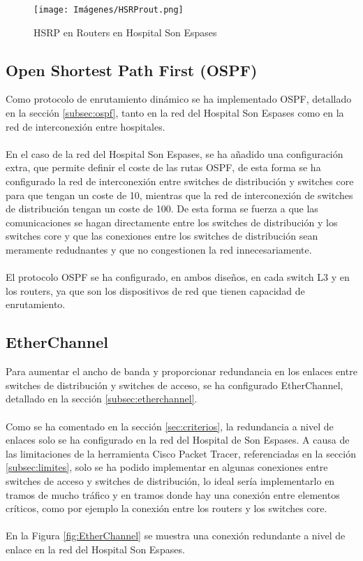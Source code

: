 \begin{figure}[H]
    \centering
    \texttt{[image: Imágenes/HSRProut.png]}
    \caption{HSRP en Routers en Hospital Son Espases}
    \label{fig:HSRPRou}
\end{figure}

\subsection{Open Shortest Path First (OSPF)}
Como protocolo de enrutamiento dinámico se ha implementado OSPF, detallado en la sección \ref{subsec:ospf}, 
tanto en la red del Hospital Son Espases como en la red de interconexión entre hospitales. 
\\ \\
En el caso de la red del Hospital Son Espases, se ha añadido una configuración extra, que permite definir el coste de las rutas OSPF, de esta forma se ha configurado la red de 
interconexión entre switches de distribución y switches core para que tengan un coste de 10, mientras que la red de interconexión de switches de distribución tengan un coste de 100. De
 esta forma se fuerza a que las comunicaciones se hagan directamente entre los switches de distribución y los switches core y que las conexiones entre los switches de distribución sean meramente redudnantes y que no 
congestionen la red innecesariamente.
\\ \\
El protocolo OSPF se ha configurado, en ambos diseños, en cada switch L3 y en los routers, ya que son los dispositivos de red que tienen capacidad de enrutamiento.

\subsection{EtherChannel}
Para aumentar el ancho de banda y proporcionar redundancia en los enlaces entre switches de distribución y switches de acceso, se ha configurado EtherChannel, detallado en la sección \ref{subsec:etherchannel}.
\\ \\
Como se ha comentado en la sección \ref{sec:criterios}, la redundancia a nivel de enlaces solo se ha configurado en la red del Hospital de Son Espases. A causa de las limitaciones de la herramienta Cisco Packet Tracer, referenciadas en la sección \ref{subsec:limites},
solo se ha podido implementar en algunas conexiones entre switches de acceso y switches de distribución, lo ideal sería implementarlo en tramos de mucho tráfico y en tramos donde hay una conexión entre elementos críticos, como por ejemplo la conexión entre los routers y los switches core.
\\ \\
En la Figura \ref{fig:EtherChannel} se muestra una conexión redundante a nivel de enlace en la red del Hospital Son Espases.

